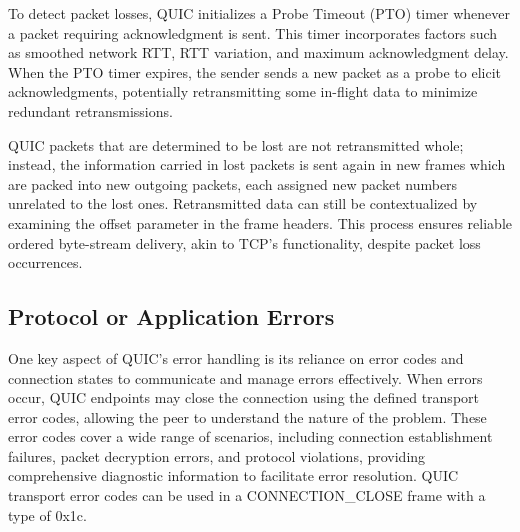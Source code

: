 To detect packet losses, QUIC initializes a Probe Timeout (PTO) timer whenever a packet requiring acknowledgment is sent. This timer incorporates factors such as smoothed network RTT, RTT variation, and maximum acknowledgment delay. When the PTO timer expires, the sender sends a new packet as a probe to elicit acknowledgments, potentially retransmitting some in-flight data to minimize redundant retransmissions.

QUIC packets that are determined to be lost are not retransmitted whole; instead, the information carried in lost packets is sent again in new frames which are packed into new outgoing packets, each assigned new packet numbers unrelated to the lost ones. Retransmitted data can still be contextualized by examining the offset parameter in the frame headers. This process ensures reliable ordered byte-stream delivery, akin to TCP's functionality, despite packet loss occurrences.

\subsection{Protocol or Application Errors}

One key aspect of QUIC's error handling is its reliance on error codes and connection states to communicate and manage errors effectively. When errors occur, QUIC endpoints may close the connection using the defined transport error codes, allowing the peer to understand the nature of the problem. These error codes cover a wide range of scenarios, including connection establishment failures, packet decryption errors, and protocol violations, providing comprehensive diagnostic information to facilitate error resolution. QUIC transport error codes can be used in a CONNECTION\_CLOSE frame with a type of 0x1c.


